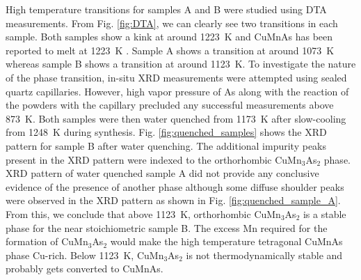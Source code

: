 \documentclass[letterpaper,10pt,doublespacing,edeposit]{uiucthesis2020}
\begin{document}
\begin{mainmatter}
High temperature transitions for samples A and B were studied using DTA measurements. From Fig. \ref{fig:DTA}, we can clearly see two transitions in each sample. Both samples show a kink at around 1223~K and CuMnAs has been reported to melt at 1223~K \cite{Uhlirova2019}. Sample A shows a transition at around 1073~K whereas sample B shows a transition at around 1123~K. To investigate the nature of the phase transition, in-situ XRD measurements were attempted using sealed quartz capillaries.
However, high vapor pressure of As along with the reaction of the powders with the capillary precluded any successful measurements above 873~K.
Both samples were then water quenched from 1173~K after slow-cooling from 1248~K during synthesis. Fig. \ref{fig:quenched_samples} shows the XRD pattern for sample B after water quenching. The additional impurity peaks present in the XRD pattern were indexed to the orthorhombic CuMn$_3$As$_2$ phase.
XRD pattern of water quenched sample A did not provide any conclusive evidence of the presence of another phase although some diffuse shoulder peaks were observed in the XRD pattern as shown in Fig. \ref{fig:quenched_sample_A}. From this, we conclude that above 1123~K, orthorhombic CuMn$_3$As$_2$ is a stable phase for the near stoichiometric sample B. The excess Mn required for the formation of CuMn$_3$As$_2$ would make the high temperature tetragonal CuMnAs phase Cu-rich. Below 1123~K, CuMn$_3$As$_2$ is not thermodynamically stable and probably gets converted to CuMnAs. 



\end{mainmatter}
\end{document}
